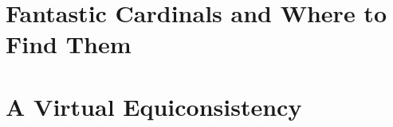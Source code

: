




\frontmatter





\setcounter{tocdepth}{2}
\tableofcontents
\thispagestyle{fancy}






\mainmatter

\newpage\part{Fantastic Cardinals and Where to Find Them}





\newpage\part{A Virtual Equiconsistency}









\appendix


\backmatter
\pagestyle{fancy}

\nocite{*}



